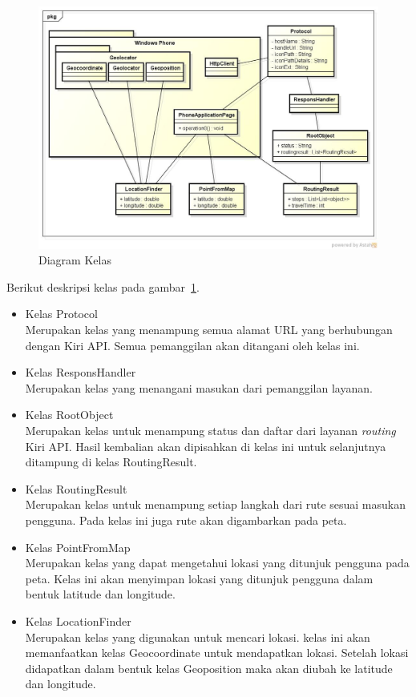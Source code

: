\begin{figure}[h]
	\centering
		\includegraphics[scale=0.4]{Gambar/useCase_dan_Class/class}
	\caption{Diagram Kelas}
	\label{fig:kelas}
\end{figure}

Berikut deskripsi kelas pada gambar~\ref{fig:kelas}.
\begin{itemize}
	\item Kelas Protocol \\
	Merupakan kelas yang menampung semua alamat URL yang berhubungan dengan Kiri API. Semua pemanggilan akan ditangani oleh kelas ini.
	\item Kelas ResponsHandler \\
	Merupakan kelas yang menangani masukan dari pemanggilan layanan.
	\item Kelas RootObject \\
	Merupakan kelas untuk menampung status dan daftar dari layanan \textit{routing} Kiri API. Hasil kembalian akan dipisahkan di kelas ini untuk selanjutnya ditampung di kelas RoutingResult. 
	\item Kelas RoutingResult \\
	Merupakan kelas untuk menampung setiap langkah dari rute sesuai masukan pengguna. Pada kelas ini juga rute akan digambarkan pada peta.
	\item Kelas PointFromMap \\
	Merupakan kelas yang dapat mengetahui lokasi yang ditunjuk pengguna pada peta. Kelas ini akan menyimpan lokasi yang ditunjuk pengguna dalam bentuk latitude dan longitude.
	\item Kelas LocationFinder \\
	Merupakan kelas yang digunakan untuk mencari lokasi. kelas ini akan memanfaatkan kelas Geocoordinate untuk mendapatkan lokasi. Setelah lokasi didapatkan dalam bentuk kelas Geoposition maka akan diubah ke latitude dan longitude. 
\end{itemize}
